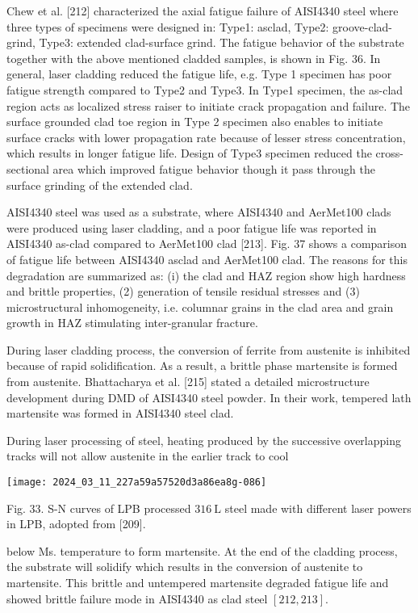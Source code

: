 \documentclass[10pt]{article}
\begin{document}
Chew et al. [212] characterized the axial fatigue failure of AISI4340 steel where three types of specimens were designed in: Type1: asclad, Type2: groove-clad-grind, Type3: extended clad-surface grind. The fatigue behavior of the substrate together with the above mentioned cladded samples, is shown in Fig. 36. In general, laser cladding reduced the fatigue life, e.g. Type 1 specimen has poor fatigue strength compared to Type2 and Type3. In Type1 specimen, the as-clad region acts as localized stress raiser to initiate crack propagation and failure. The surface grounded clad toe region in Type 2 specimen also enables to initiate surface cracks with lower propagation rate because of lesser stress concentration, which results in longer fatigue life. Design of Type3 specimen reduced the cross-sectional area which improved fatigue behavior though it pass through the surface grinding of the extended clad.

AISI4340 steel was used as a substrate, where AISI4340 and AerMet100 clads were produced using laser cladding, and a poor fatigue life was reported in AISI4340 as-clad compared to AerMet100 clad [213]. Fig. 37 shows a comparison of fatigue life between AISI4340 asclad and AerMet100 clad. The reasons for this degradation are summarized as: (i) the clad and HAZ region show high hardness and brittle properties, (2) generation of tensile residual stresses and (3) microstructural inhomogeneity, i.e. columnar grains in the clad area and grain growth in HAZ stimulating inter-granular fracture.

During laser cladding process, the conversion of ferrite from austenite is inhibited because of rapid solidification. As a result, a brittle phase martensite is formed from austenite. Bhattacharya et al. [215] stated a detailed microstructure development during DMD of AISI4340 steel powder. In their work, tempered lath martensite was formed in AISI4340 steel clad.

During laser processing of steel, heating produced by the successive overlapping tracks will not allow austenite in the earlier track to cool

\begin{center}
\texttt{[image: 2024\_03\_11\_227a59a57520d3a86ea8g-086]}
\end{center}

Fig. 33. S-N curves of LPB processed $316 \mathrm{~L}$ steel made with different laser powers in LPB, adopted from [209].

below Ms. temperature to form martensite. At the end of the cladding process, the substrate will solidify which results in the conversion of austenite to martensite. This brittle and untempered martensite degraded fatigue life and showed brittle failure mode in AISI4340 as clad steel $[212,213]$.
\end{document}
